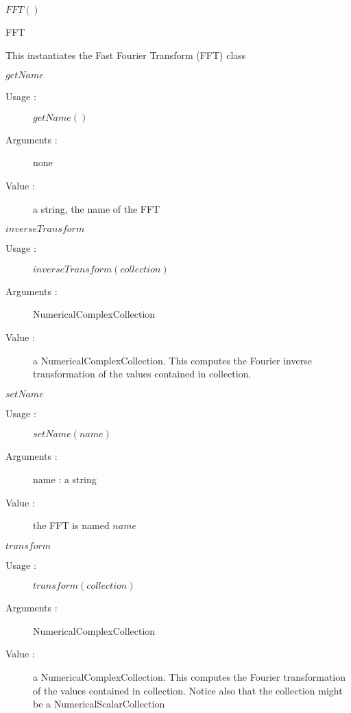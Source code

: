 \begin{description}

\item[Usage :] \rule{0pt}{1em}
  \begin{description}
  \item $FFT()$
  \item
  \end{description}

\item[Value :] FFT
  \begin{description}
  \item This instantiates the Fast Fourier Transform (FFT) class
  \end{description}

\item[Some methods :]  \rule{0pt}{1em}
  \begin{description}
  \item $getName$
    \begin{description}
    \item[Usage :] $getName()$
    \item[Arguments :] none
    \item[Value :] a string, the name of the FFT
    \end{description}
    \bigskip

  \item $inverseTransform$
    \begin{description}
    \item[Usage :] $inverseTransform(collection)$
    \item[Arguments :] NumericalComplexCollection 
    \item[Value :] a NumericalComplexCollection. This computes the Fourier inverse transformation of the values contained in collection. 
    \end{description}
    \bigskip

  \item $setName$
    \begin{description}
    \item[Usage :] $setName(name)$
    \item[Arguments :] name : a string
    \item[Value :] the FFT is named $name$
    \end{description}
    \bigskip

  \item $transform$
    \begin{description}
    \item[Usage :] $transform(collection)$
    \item[Arguments :] NumericalComplexCollection 
    \item[Value :] a NumericalComplexCollection. This computes the Fourier transformation of the values contained in collection. Notice also that the collection might be a NumericalScalarCollection
    \end{description}
    \bigskip
  \end{description}
\end{description}


